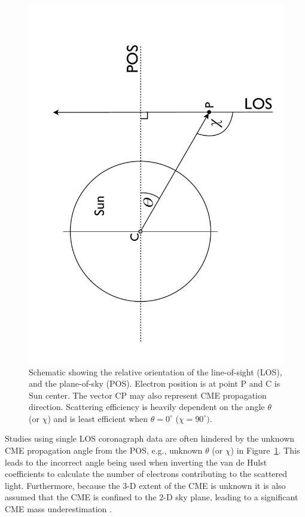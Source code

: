 \begin{figure}[h!]
\includegraphics[trim = 0cm 0cm 0cm 0cm, scale=0.3, angle=270]{images/LOS_POS_2.pdf}
\caption{Schematic showing the relative orientation of the line-of-sight (LOS), and the plane-of-sky (POS). Electron position is at point P and C is 
Sun center. The vector CP may also represent CME propagation direction. Scattering efficiency is heavily dependent on the angle $\theta$ 
(or $\chi$) and is least efficient 
when $\theta = 0^{\circ}$ ($\chi=90^{\circ})$.}
\label{fig:LOS_POS_2}
\end{figure}

Studies using single LOS coronagraph data are often hindered by the unknown CME propagation angle from the POS, e.g., unknown $\theta$ (or $\chi$) in 
Figure~\ref{fig:LOS_POS_2}. This leads to the incorrect angle being used when inverting the van de Hulst coefficients to calculate the number of electrons 
contributing to the scattered light. 
Furthermore, because the 3-D extent of the CME is unknown it is also assumed that the CME is confined to the 2-D sky plane, leading to a significant CME 
mass underestimation \citep{vou00}.

